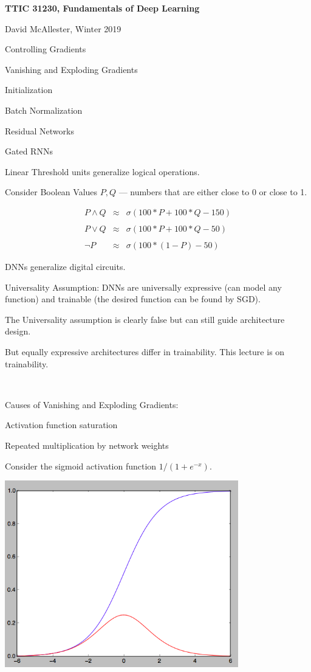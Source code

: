 




{\Huge

  \centerline{\bf TTIC 31230, Fundamentals of Deep Learning}
  \bigskip
  \centerline{David McAllester, Winter 2019}
  \vfill
  \centerline{Controlling Gradients}
  \vfill
  \vfill
  \centerline{Vanishing and Exploding Gradients}
  \vfill
  \centerline{Initialization}
  \vfill
  \centerline{Batch Normalization}
  \vfill
  \centerline{Residual Networks}
  \vfill
  \centerline{Gated RNNs}


Linear Threshold units generalize logical operations.

\vfill
Consider Boolean Values $P,Q$ --- numbers that are either close to 0 or close to 1.

\vfill
\begin{eqnarray*}
P \wedge Q & \approx & \sigma(100*P + 100* Q -150) \\
\\
P \vee Q & \approx & \sigma(100*P + 100* Q -50) \\
\\
\neg P & \approx & \sigma(100*(1-P) - 50)
\end{eqnarray*}

\vfill
DNNs generalize digital circuits.


{\color{red} Universality Assumption:} DNNs are universally expressive (can model any function) and trainable (the desired function can be found by SGD).

\vfill
The Universality assumption is clearly false but can still guide architecture design.

\vfill
But equally expressive architectures differ in trainability.  This lecture is on trainability.

~
\vfill
\centerline{Causes of Vanishing and Exploding Gradients:}
\vfill
\centerline{Activation function saturation}
\vfill
\centerline{Repeated multiplication by network weights}
\vfill


Consider the sigmoid activation function $1/(1+ e^{-x})$.

\vfill
\centerline{\includegraphics[width= 4.0in]{../images/sigmoid2}}


}
